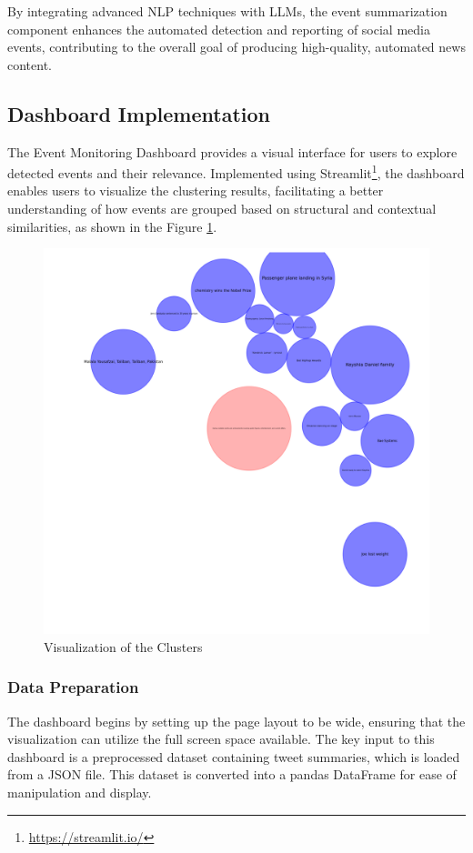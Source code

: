 By integrating advanced NLP techniques with LLMs, the event summarization component enhances the automated detection and reporting of social media events, contributing to the overall goal of producing high-quality, automated news content.

\subsection{Dashboard Implementation} 
\label{sec:dashboard}
The Event Monitoring Dashboard provides a visual interface for users to explore detected events and their relevance. Implemented using Streamlit\footnote{\url{https://streamlit.io/}}, the dashboard enables users to visualize the clustering results, facilitating a better understanding of how events are grouped based on structural and contextual similarities, as shown in the Figure \ref{fig:dashboard}.

\begin{figure}[htbp]
    \centering
    \includegraphics[width=1\linewidth]{Images/dashboard.png}
    \caption{Visualization of the Clusters}
    \label{fig:dashboard}
\end{figure}
\subsubsection{Data Preparation} 
The dashboard begins by setting up the page layout to be wide, ensuring that the visualization can utilize the full screen space available. The key input to this dashboard is a preprocessed dataset containing tweet summaries, which is loaded from a JSON file. This dataset is converted into a pandas DataFrame for ease of manipulation and display.

